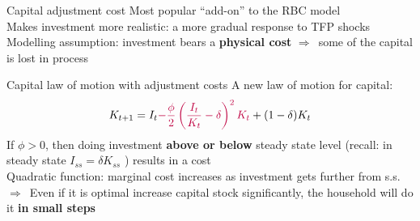 \documentclass{beamer}
\newcommand{\tb}[1]{{\color{blue}{\textbf{#1}}}}
\newcommand{\rarr}{$\Rightarrow$\ }
\begin{document}
\begin{frame}{Capital adjustment cost}
    Most popular ``add-on'' to the RBC model \\ \vfill
    Makes investment more realistic: a more gradual response to TFP shocks \\ \vfill
    Modelling assumption: investment bears a \textbf{physical cost} \rarr some of the capital is lost in process
\end{frame}

\begin{frame}{Capital law of motion with adjustment costs}
  A new law of motion for capital: 
$$
K_{t+1}=I_{t}\textcolor{purple}{-\frac{\phi}{2}\left(\frac{I_{t}}{K_{t}}-\delta\right)^{2} K_{t}}+(1-\delta) K_{t}
$$
If $\phi>0$, then doing investment \textbf{above or below} steady state level (recall: in steady state $I_{ss}=\delta K_{ss}$ ) results in a cost  \\ \vfill Quadratic function: marginal cost increases as investment gets further from s.s. \\ \vfill \rarr Even if it is optimal increase capital stock significantly, the household will do it \textbf{in small steps}
\end{frame}
\end{document}
